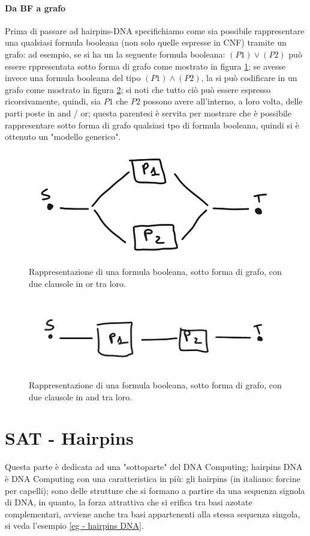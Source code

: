\documentclass[12pt,a4paper]{report}
\begin{document}
\paragraph{Da BF a grafo}
Prima di passare ad hairpins-DNA specifichiamo come sia possibile rappresentare una qualsiasi formula booleana (non solo quelle espresse in CNF) tramite un grafo: ad esempio, se si ha un la seguente formula booleana: $(P1) \vee (P2)$ può essere rppresentata sotto forma di grafo come mostrato in figura \ref{fig:3}; se avesse invece una formula booleana del tipo $(P1) \wedge (P2)$, la si può codificare in un grafo come mostrato in figura \ref{fig:4}; si noti che tutto ciò può essere espresso ricorsivamente, quindi, sia $P1$ che $P2$ possono avere all'interno, a loro volta, delle parti poste in and / or; questa parentesi è servita per mostrare che è possibile rappresentare sotto forma di grafo qualsiasi tpo di formula booleana, quindi si è ottenuto un "modello generico".
\begin{figure}[h]
	\centering
	\includegraphics[width=0.5\linewidth]{img/bf to graph 1}
	\caption{Rappresentazione di una formula booleana, sotto forma di grafo, con due clausole in or tra loro.}
	\label{fig:3}
\end{figure}

\begin{figure}[h]
	\centering
	\includegraphics[width=0.5\linewidth]{img/bf to graph 2}
	\caption{Rappresentazione di una formula booleana, sotto forma di grafo, con due clausole in and tra loro.}
	\label{fig:4}
\end{figure}

\section{SAT - Hairpins}
Questa parte è dedicata ad una "sottoparte" del DNA Computing; hairpins DNA è DNA Computing con una caratteristica in più: gli hairpins (in italiano: forcine per capelli); sono delle strutture che si formano a partire da una sequenza signola di DNA, in quanto, la forza attrattiva che si erifica tra basi azotate complementari, avviene anche tra basi appartenenti alla stessa sequenza singola, si veda l'esempio \ref{eg - hairpins DNA}.
\end{document}
